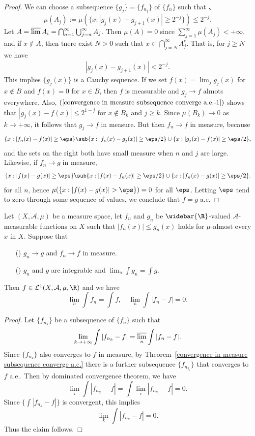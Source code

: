 \begin{proof}
We can choose a subsequence $\{g_j\}=\{f_{n_j}\}$ of $\{f_n\}$ such that 、\[\mu(A_j):=\mu(\{x:|g_j(x)-g_{j+1}(x)|\geq 2^{-j}\})\leq 2^{-j}.\]
Let $A=\varlimsup A_i=\bigcap_{n=1}^{\infty}\bigcup_{j=n}^{\infty}A_j$. Then $\mu(A)=0$ since $\sum_{j=1}^{\infty}\mu(A_j)<+\infty$, and if $x\notin A$, then tnere exist $N>0$ such that $x\in\bigcap_{j=N}^{\infty}A_j^c$. That is, for $j\geq N$ we have
\begin{align}\label{convergence in measure subsequence converge a.e.-1}
|g_j(x)-g_{j+1}(x)|<2^{-j}.
\end{align}
This implies $\{g_j(x)\}$ is a Cauchy sequence. If we set $f(x)=\lim_jg_j(x)$ for $x\notin B$ and $f(x)=0$ for $x\in B$, then $f$ is measurable and $g_j\to f$ almots everywhere. Also, $(\ref{convergence in measure subsequence converge a.e.-1})$ shows that $|g_j(x)-f(x)|\leq 2^{1-j}$ for $x\notin B_k$ and $j\geq k$. Since $\mu(B_k)\to 0$ as $k\to+\infty$, it follows that $g_j\to f$ in measure. But then $f_n\to f$ in measure, because
\[\{x:|f_n(x)-f(x)|\geq\eps\}\sub\{x:|f_n(x)-g_j(x)|\geq\eps/2\}\cup\{x:|g_j(x)-f(x)|\geq\eps/2\},\]
and the sets on the right both have small measure when $n$ and $j$ are large. Likewise, if $f_n\to g$ in measure,
\[\{x:|f(x)-g(x)|\geq\eps\}\sub\{x:|f(x)-f_n(x)|\geq\eps/2\}\cup\{x:|f_n(x)-g(x)|\geq\eps/2\}.\]
for all $n$, hence $\mu(\{x:|f(x)-g(x)|>\eps\})=0$ for all $\eps$. Letting $\eps$ tend to zero through some sequence of values, we conclude that $f=g$ a.e.
\end{proof}
\begin{corollary}\label{DTC for converge in measure}
Let $(X,\mathcal{A},\mu)$ be a measure space, let $f_n$ and $g_n$ be $\widebar{\R}$-valued $\mathcal{A}$-measurable functions on $X$ such that $|f_n(x)|\leq g_n(x)$ holds for $\mu$-almost every $x$ in $X$. Suppose that
\begin{itemize}
\item[(\rmnum{1})] $g_n\to g$ and $f_n\to f$ in measure.
\item[(\rmnum{2})] $g_n$ and $g$ are integrable and $\lim_n\int g_n=\int g$.
\end{itemize}
Then $f\in\mathcal{L}^1(X,\mathcal{A},\mu,\R)$ and we have
\[\lim_n\int f_n=\int f,\quad \lim_n\int|f_n-f|=0.\]
\end{corollary}
\begin{proof}
Let $\{f_{n_k}\}$ be a subsequence of $\{f_n\}$ such that
\[\lim_{k\to+\infty}\int|f_{n_k}-f|=\varlimsup_{n}\int|f_n-f|.\]
Since $\{f_{n_k}\}$ also converges to $f$ in measure, by Theorem~\ref{convergence in measure subsequence converge a.e.} there is a further subsequence $\{f_{n_{k_i}}\}$ that converges to $f$ a.e.. Then by dominated convergence theorem, we have
\[\lim_{i}\int|f_{n_{k_i}}-f|=\int\lim_{i}|f_{n_{k_i}}-f|=0.\]
Since $\{\int|f_{n_k}-f|\}$ is convergent, this implies
\[\lim_{k}\int|f_{n_k}-f|=0.\]
Thus the claim follows.
\end{proof}
